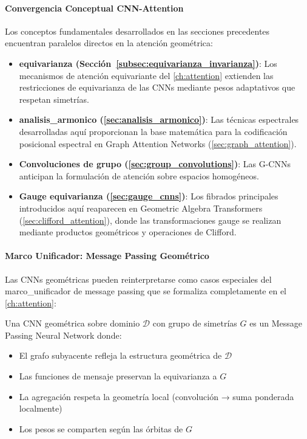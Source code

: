 \paragraph{Convergencia Conceptual CNN-Attention}

Los conceptos fundamentales desarrollados en las secciones precedentes encuentran paralelos directos en la atención geométrica:

\begin{itemize}
\item \textbf{\gls{equivarianza} (Sección~\ref{subsec:equivarianza_invarianza})}: Los mecanismos de atención equivariante del \autoref{ch:attention} extienden las restricciones de equivarianza de las CNNs mediante pesos adaptativos que respetan simetrías.

\item \textbf{\gls{analisis_armonico} (\autoref{sec:analisis_armonico})}: Las técnicas espectrales desarrolladas aquí proporcionan la base matemática para la codificación posicional espectral en Graph Attention Networks (\autoref{sec:graph_attention}).

\item \textbf{Convoluciones de grupo (\autoref{sec:group_convolutions})}: Las G-CNNs anticipan la formulación de atención sobre espacios homogéneos.

\item \textbf{Gauge equivarianza (\autoref{sec:gauge_cnns})}: Los fibrados principales introducidos aquí reaparecen en Geometric Algebra Transformers (\autoref{sec:clifford_attention}), donde las transformaciones gauge se realizan mediante productos geométricos y operaciones de Clifford.
\end{itemize}

\paragraph{Marco Unificador: Message Passing Geométrico}

Las CNNs geométricas pueden reinterpretarse como casos especiales del \gls{marco_unificador} de message passing que se formaliza completamente en el \autoref{ch:attention}:

\begin{definition}\label{def:cnn_as_structured_mp}
Una CNN geométrica sobre dominio $\mathcal{D}$ con grupo de simetrías $G$ es un Message Passing Neural Network donde:
\begin{itemize}
    \item El grafo subyacente refleja la estructura geométrica de $\mathcal{D}$
    \item Las funciones de mensaje preservan la equivarianza a $G$
    \item La agregación respeta la geometría local (convolución → suma ponderada localmente)
    \item Los pesos se comparten según las órbitas de $G$
\end{itemize}
\end{definition}

